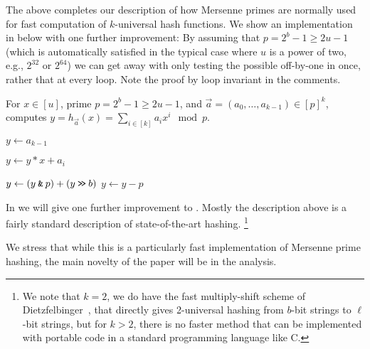 \vspace{1em}

The above completes our description of how Mersenne primes are
normally used for fast computation of $k$-universal hash functions.
We show an implementation in  below with one further improvement:
By assuming that $p=2^b-1\geq 2u-1$
(which is automatically satisfied in the typical case where $u$ is a power
of two, e.g., $2^{32}$ or $2^{64}$)
we can get away with only testing the possible off-by-one in  once, rather that at every loop.
Note the proof by loop invariant in the comments.

\begin{algorithm}[H]
   \caption{
      For $x\in [u]$, prime $p=2^b-1\geq 2u-1$,
      and $\vec a=(a_0,\ldots,a_{k-1})\in[p]^k$,
      computes $y=h_{\vec a}(x)=\sum_{i\in[k]}a_i x^i\mod p$.
   }\label{alg:Mersenne}
   \begin{algorithmic}
      \State $y\gets a_{k-1}$

      \State $y\gets y*x+a_i$

      \State $y\gets (y\mathbin{\texttt{\&}} p)+(y\mathbin{\texttt{>\!>}} b)$
      \EndFor
      \State $y\gets y-p$
      \EndIf
   \end{algorithmic}
\end{algorithm}


In  we will give one further improvement to .
Mostly the description above is a fairly standard description of state-of-the-art hashing.
\footnote{We note that $k=2$, we do have the fast multiply-shift scheme of Dietzfelbinger~\cite{dietzfel96universal}, that directly gives 2-universal
hashing from $b$-bit strings to $\ell$-bit strings, but for $k>2$,
there is no faster method that can be implemented with portable code
in a standard programming language like C.}

We stress that while this is a particularly fast implementation of Mersenne prime hashing, the main novelty of the paper will be in the analysis.



